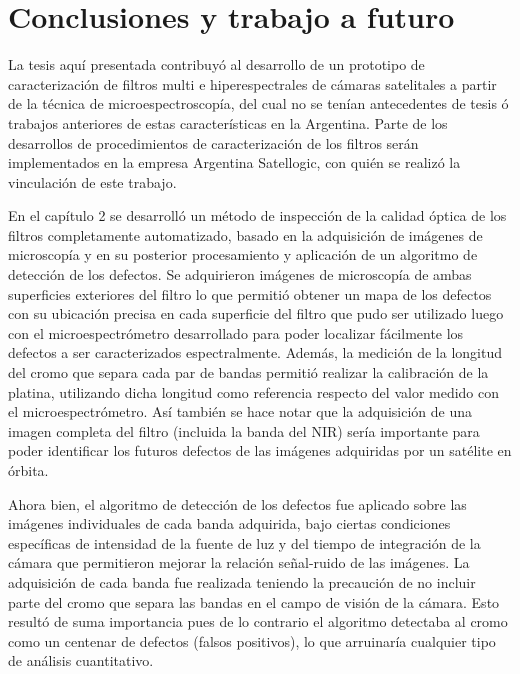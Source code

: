\singlespacing
\chapter{Conclusiones y trabajo a futuro}
\label{chap:concls}

\hspace{0.5cm}La tesis aquí presentada contribuyó al desarrollo de un prototipo de caracterización de filtros multi e hiperespectrales de cámaras satelitales a partir de la técnica de microespectroscopía, del cual no se tenían antecedentes de tesis ó trabajos anteriores de estas características en la Argentina. Parte de los desarrollos de procedimientos de caracterización de los filtros serán implementados en la empresa Argentina Satellogic, con quién se realizó la vinculación de este trabajo.

En el capítulo 2 se desarrolló un método de inspección de la calidad óptica de los filtros completamente automatizado, basado en la adquisición de imágenes de microscopía y en su posterior procesamiento y aplicación de un algoritmo de detección de los defectos. Se adquirieron imágenes de microscopía de ambas superficies exteriores del filtro lo que permitió obtener un mapa de los defectos con su ubicación precisa en cada superficie del filtro que pudo ser utilizado luego con el microespectrómetro desarrollado para poder localizar fácilmente los defectos a ser caracterizados espectralmente. Además, la medición de la longitud del cromo que separa cada par de bandas permitió realizar la calibración de la platina, utilizando dicha longitud como referencia respecto del valor medido con el microespectrómetro. Así también se hace notar que la adquisición de una imagen completa del filtro (incluida la banda del NIR) sería importante para poder identificar los futuros defectos de las imágenes adquiridas por un satélite en órbita.

Ahora bien, el algoritmo de detección de los defectos fue aplicado sobre las imágenes individuales de cada banda adquirida, bajo ciertas condiciones específicas de intensidad de la fuente de luz y del tiempo de integración de la cámara que permitieron mejorar la relación señal-ruido de las imágenes. La adquisición de cada banda fue realizada teniendo la precaución de no incluir parte del cromo que separa las bandas en el campo de visión de la cámara. Esto resultó de suma importancia pues de lo contrario el algoritmo detectaba al cromo como un centenar de defectos (falsos positivos), lo que arruinaría cualquier tipo de análisis cuantitativo.

